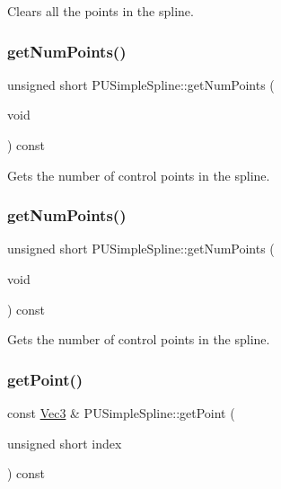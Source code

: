 Clears all the points in the spline. \mbox{\label{classPUSimpleSpline_aff27dad383a423321ff1d35b37f3770e}} 
\subsubsection{\texorpdfstring{get\+Num\+Points()}{getNumPoints()}\hspace{0.1cm}{\footnotesize\ttfamily [1/2]}}
{\footnotesize\ttfamily unsigned short P\+U\+Simple\+Spline\+::get\+Num\+Points (\begin{DoxyParamCaption}\item[{void}]{ }\end{DoxyParamCaption}) const}

Gets the number of control points in the spline. \mbox{\label{classPUSimpleSpline_aff27dad383a423321ff1d35b37f3770e}} 
\subsubsection{\texorpdfstring{get\+Num\+Points()}{getNumPoints()}\hspace{0.1cm}{\footnotesize\ttfamily [2/2]}}
{\footnotesize\ttfamily unsigned short P\+U\+Simple\+Spline\+::get\+Num\+Points (\begin{DoxyParamCaption}\item[{void}]{ }\end{DoxyParamCaption}) const}

Gets the number of control points in the spline. \mbox{\label{classPUSimpleSpline_a3b217c8b9c53dbac86d03dbc6be92c67}} 
\subsubsection{\texorpdfstring{get\+Point()}{getPoint()}\hspace{0.1cm}{\footnotesize\ttfamily [1/2]}}
{\footnotesize\ttfamily const \hyperlink{classVec3}{Vec3} \& P\+U\+Simple\+Spline\+::get\+Point (\begin{DoxyParamCaption}\item[{unsigned short}]{index }\end{DoxyParamCaption}) const}

